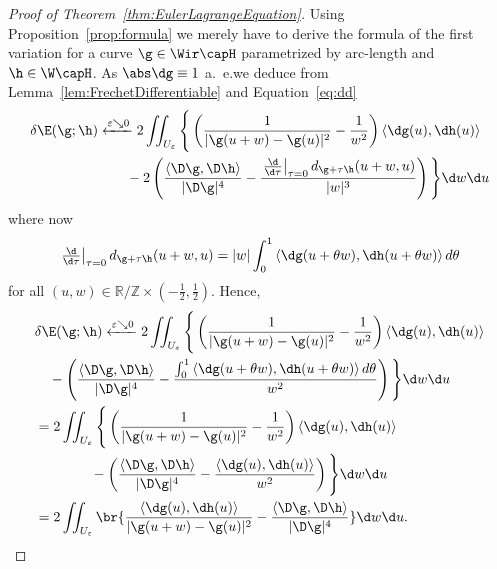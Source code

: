 \begin{proof}[Proof of Theorem~\ref{thm:EulerLagrangeEquation}]
 Using Proposition~\ref{prop:formula} we merely have to derive the formula of the first variation
 for a curve $\g \in \Wir\capH$ parametrized by arc-length
 and $\h \in \W\capH$.
 As $\abs\dg\equiv1$ a.~e.\@ we deduce from Lemma~\ref{lem:FrechetDifferentiable} 
 and Equation~\eqref{eq:dd}
 \begin{align*}
  \delta\E(\g;\h) &\xleftarrow{\varepsilon \searrow 0} 2\iint_{U_\varepsilon}
\Bigg\{\left(\frac 1 {|\g(u+w) - \g(u)|^2} - \frac 1 {w^2} \right)
  \left\langle \dg(u), \dh(u) \right\rangle  \\
  &\qquad {}- 2  \left(\frac{\left\langle \D\g ,\D \h \right\rangle }{|\D\g|^{4}}
    -\frac{\left.\tfrac{\d}{\d\tau}\right|_{\tau=0}d_{\g+\tau\h}(u+w,u)}{|w|^{3}}\right)\Bigg\}
  \d w\d u 
 \end{align*}
 where now 
 \begin{equation*}
  \left.\tfrac{\d}{\d\tau}\right|_{\tau=0}d_{\g+\tau\h}(u+w,u) = |w|\int_0^1 \left\langle \dg(u+ \theta w), \dh(u+\theta w) \right\rangle d\theta
 \end{equation*}
 for all $(u,w) \in \mathbb R / \mathbb Z \times (-\tfrac12, \tfrac12)$. Hence,
 \begin{align*}
  &\delta\E(\g;\h) 
  \xleftarrow{\varepsilon \searrow 0}2\iint_{U_\varepsilon}  \Bigg\{
    \left(\frac 1 {|\g(u+w) - \g(u)|^2} - \frac 1 {w^2} \right) 
    \left\langle \dg(u), \dh(u) \right\rangle \\
    &\quad{} -   \left(\frac{\left\langle \D\g ,\D \h \right\rangle }{|\D\g|^{4}}
    -\frac{\int_0^1 \left\langle \dg(u+\theta w ), \dh(u+\theta w) \right\rangle d\theta}
    {w^2}\right) \Bigg\}\d w\d u \\
  & = 2\iint_{U_\varepsilon} \Bigg\{
    \left(\frac 1 {|\g(u+w) - \g(u)|^2} - \frac 1 {w^2} \right) 
    \left\langle \dg(u), \dh(u) \right\rangle \\
    &\qquad\qquad{} - \left(\frac{\left\langle \D\g ,\D \h \right\rangle }{|\D\g|^{4}}
    -\frac{\left\langle \dg(u), \dh(u) \right\rangle}{w^2}\right) \Bigg\}\d w\d u\\
& = 2\iint_{U_\varepsilon} 
  \br{\frac  {\left\langle \dg(u), \dh(u) \right\rangle} {|\g(u+w) - \g(u)|^2}
            - \frac{\left\langle \D\g ,\D \h \right\rangle }{|\D\g|^{4}} } \d w\d u.
\end{align*}
\end{proof}